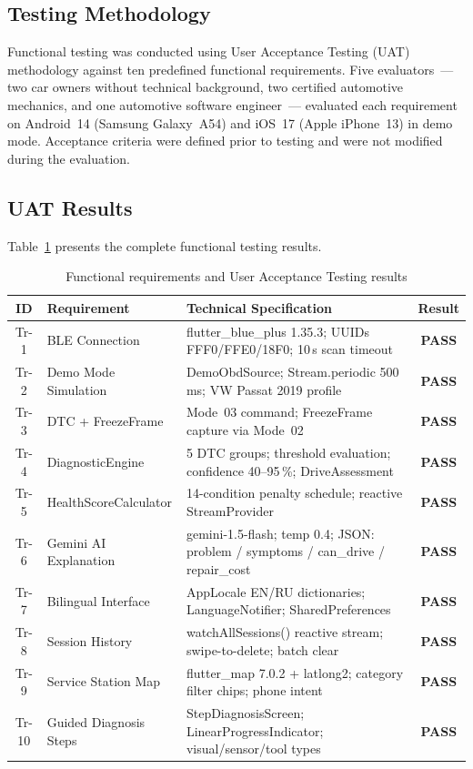 \subsection{Testing Methodology}

Functional testing was conducted using User Acceptance Testing (UAT) methodology against ten predefined functional requirements.
Five evaluators~--- two car owners without technical background, two certified automotive mechanics, and one automotive software engineer~--- evaluated each requirement on Android~14 (Samsung Galaxy~A54) and iOS~17 (Apple iPhone~13) in demo mode.
Acceptance criteria were defined prior to testing and were not modified during the evaluation.

\subsection{UAT Results}

Table~\ref{tab:uat} presents the complete functional testing results.

\begin{table}[!htbp]
\centering
\caption{Functional requirements and User Acceptance Testing results}
\label{tab:uat}
\begin{tabularx}{0.98\linewidth}{c p{3.2cm} p{7.0cm} c}
\toprule
\rowcolor{tblhdr}
\color{white}\textbf{ID} &
\color{white}\textbf{Requirement} &
\color{white}\textbf{Technical Specification} &
\color{white}\textbf{Result} \\
\midrule
Tr-1  & BLE Connection         & flutter\_blue\_plus 1.35.3; UUIDs FFF0/FFE0/18F0; 10\,s scan timeout & \textbf{PASS} \\
Tr-2  & Demo Mode Simulation   & DemoObdSource; Stream.periodic 500\,ms; VW Passat 2019 profile & \textbf{PASS} \\
Tr-3  & DTC + FreezeFrame      & Mode~03 command; FreezeFrame capture via Mode~02 & \textbf{PASS} \\
Tr-4  & DiagnosticEngine       & 5 DTC groups; threshold evaluation; confidence 40--95\,\%; DriveAssessment & \textbf{PASS} \\
Tr-5  & HealthScoreCalculator  & 14-condition penalty schedule; reactive StreamProvider & \textbf{PASS} \\
Tr-6  & Gemini AI Explanation  & gemini-1.5-flash; temp 0.4; JSON: problem / symptoms / can\_drive / repair\_cost & \textbf{PASS} \\
Tr-7  & Bilingual Interface    & AppLocale EN/RU dictionaries; LanguageNotifier; SharedPreferences & \textbf{PASS} \\
Tr-8  & Session History        & watchAllSessions() reactive stream; swipe-to-delete; batch clear & \textbf{PASS} \\
Tr-9  & Service Station Map    & flutter\_map 7.0.2 + latlong2; category filter chips; phone intent & \textbf{PASS} \\
Tr-10 & Guided Diagnosis Steps & StepDiagnosisScreen; LinearProgressIndicator; visual/sensor/tool types & \textbf{PASS} \\
\bottomrule
\end{tabularx}
\end{table}

